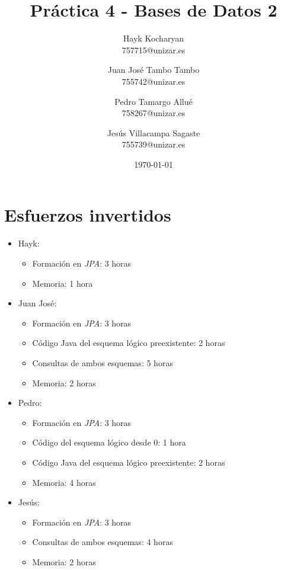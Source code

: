 \documentclass[11pt,a4paper]{article}
\begin{document}
\begin{titlepage}
	\title{{\Huge \textbf{Práctica 4 - Bases de Datos 2}}}
	\author{
	  Hayk Kocharyan\\
	  757715@unizar.es
	  \and
	  Juan José Tambo Tambo\\
	  755742@unizar.es
	  \and
	  Pedro Tamargo Allué\\
	  758267@unizar.es
	  \and
	  Jesús Villacampa Sagaste\\
	  755739@unizar.es
	}
	\date{\today}
	
	\clearpage\maketitle
	\thispagestyle{empty}
	\tableofcontents
	\listoffigures
\end{titlepage}

\section{Esfuerzos invertidos}

\begin{itemize}
\item Hayk:
	\begin{itemize}
	\item Formación en \emph{JPA}: 3 horas
	\item Memoria: 1 hora
	\end{itemize}
\item Juan José:
	\begin{itemize}
	\item Formación en \emph{JPA}: 3 horas
	\item Código Java del esquema lógico preexistente: 2 horas
	\item Consultas de ambos esquemas: 5 horas
	\item Memoria: 2 horas
	\end{itemize}
\item Pedro:
	\begin{itemize}
	\item Formación en \emph{JPA}: 3 horas
	\item Código del esquema lógico desde 0: 1 hora
	\item Código Java del esquema lógico preexistente: 2 horas
	\item Memoria: 4 horas
	\end{itemize}
\item Jesús:
	\begin{itemize}
	\item Formación en \emph{JPA}: 3 horas
	\item Consultas de ambos esquemas: 4 horas
	\item Memoria: 2 horas
	\end{itemize}
\end{itemize}
\end{document}
